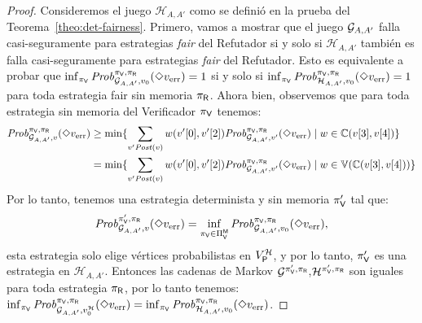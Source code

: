 \begin{proof} 
Consideremos el juego $\mathcal{H}_{A,A'}$ como se definió en la prueba del Teorema~\ref{theo:det-fairness}.  Primero, vamos a mostrar que el juego $\StochG_{A,A'}$ falla casi-seguramente para estrategias \emph{fair} del Refutador si y solo si $\mathcal{H}_{A,A'}$ también es falla casi-seguramente para estrategias \emph{fair} del Refutador.  
Esto es equivalente a probar que $\inf_{\strat{\Verifier}} \Prob{\strat{\Verifier}}{\strat{\Refuter}}_{\StochG_{A,A'}, \InitVertex}(\Diamond \ErrorSt)=1$ 
si y solo si $\inf_{\strat{\Verifier}} \Prob{\strat{\Verifier}}{\strat{\Refuter}}_{\mathcal{H}_{A,A'}, \InitVertex}(\Diamond \ErrorSt)=1$ para toda estrategia fair sin memoria  $\strat{\Refuter}$. Ahora bien, observemos que para toda estrategia sin memoria del Verificador $\strat{\Verifier}$ tenemos:
\begin{align*}
     \Prob{\strat{\Verifier}}{\strat{\Refuter}}_{\mathcal{G}_{A,A'}, v}(\Diamond \ErrorSt) & \geq \min\{ \sum_{v' \post(v)} w(\pr{0}{v'}, \pr{2}{v'})\Prob{\strat{\Verifier}}{\strat{\Refuter}}_{\mathcal{G}_{A,A'}, v'}(\Diamond \ErrorSt) \mid w \in \couplings{\pr{3}{v}}{\pr{4}{v}} \}\\
         & = \min\{ \sum_{v' \post(v)} w(\pr{0}{v'}, \pr{2}{v'})\Prob{\strat{\Verifier}}{\strat{\Refuter}}_{\mathcal{G}_{A,A'}, v'}(\Diamond \ErrorSt) \mid w \in\vertices{\couplings{\pr{3}{v}}{\pr{4}{v}}} \}
\end{align*}
Por lo tanto, tenemos una estrategia determinista y sin memoria $\strat{\Verifier}'$ tal que:
\[
\Prob{\strat{\Verifier}'}{\strat{\Refuter}}_{\mathcal{G}_{A,A'}, v}(\Diamond \ErrorSt) = \inf_{\strat{\Verifier} \in \Strategies{\Verifier}^{\Memoryless}} \Prob{\strat{\Verifier}}{\strat{\Refuter}}_{\StochG_{A,A'}, \InitVertex}(\Diamond \ErrorSt),
\]
esta estrategia solo elige vértices probabilistas en  $V^{\mathcal{H}}_{\Probabilistic}$, y por lo tanto, $\strat{\Verifier}'$ es una estrategia 
en $\mathcal{H}_{A,A'}$. Entonces las cadenas de Markov  $\StochG^{\strat{\Verifier}',\strat{\Refuter}}$,$ \mathcal{H}^{\strat{\Verifier}',\strat{\Refuter}}$
son iguales para toda estrategia $\strat{\Refuter}$, por lo tanto tenemos: 
$\inf_{\strat{\Verifier}} \Prob{\strat{\Verifier}}{\strat{\Refuter}}_{\StochG_{A,A'}, v^{\mathcal{H}}_0}(\Diamond \ErrorSt)
= \inf_{\strat{\Verifier}} \Prob{\strat{\Verifier}}{\strat{\Refuter}}_{\mathcal{H}_{A,A'}, \InitVertex}(\Diamond \ErrorSt)$.


\end{proof}
